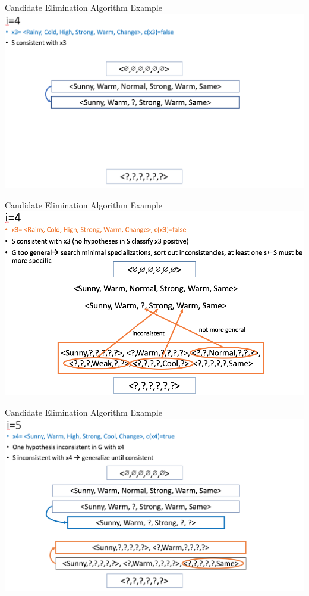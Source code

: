 \documentclass{beamer}
\begin{document}
\begin{frame}{Candidate Elimination Algorithm Example}
\centering
\includegraphics[width=1.1\textwidth]{cea_4}
\end{frame}

\begin{frame}{Candidate Elimination Algorithm Example}
\centering
\includegraphics[width=1\textwidth]{cea_5}
\end{frame}

\begin{frame}{Candidate Elimination Algorithm Example}
\centering
\includegraphics[width=1.1\textwidth]{cea_6}
\end{frame}
\end{document}
